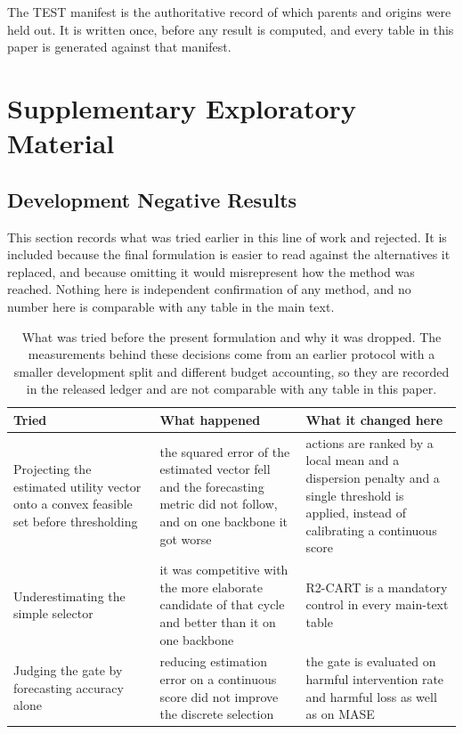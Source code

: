 \documentclass{article}
\begin{document}
The TEST manifest is the authoritative record of which parents and origins were held out. It
is written once, before any result is computed, and every table in this paper is generated
against that manifest.

\section*{Supplementary Exploratory Material}
\label{app:supplementary}
\subsection{Development Negative Results}
\label{app:development}
This section records what was tried earlier in this line of work and rejected. It is included
because the final formulation is easier to read against the alternatives it replaced, and
because omitting it would misrepresent how the method was reached. Nothing here is independent
confirmation of any method, and no number here is comparable with any table in the main text.

\begin{table}[htbp]
  \caption{What was tried before the present formulation and why it was dropped. The
  measurements behind these decisions come from an earlier protocol with a smaller development
  split and different budget accounting, so they are recorded in the released ledger and are
  not comparable with any table in this paper.}
  \label{tab:app-development}
  \centering
  \small
  \setlength{\tabcolsep}{4pt}
\begin{tabular}{@{}p{} p{} p{}@{}}
    \toprule
    Tried & What happened & What it changed here \\
    \midrule
    Projecting the estimated utility vector onto a convex feasible set before thresholding & the squared error of the estimated vector fell and the forecasting metric did not follow, and on one backbone it got worse & actions are ranked by a local mean and a dispersion penalty and a single threshold is applied, instead of calibrating a continuous score \\
    Underestimating the simple selector & it was competitive with the more elaborate candidate of that cycle and better than it on one backbone & R2-CART is a mandatory control in every main-text table \\
    Judging the gate by forecasting accuracy alone & reducing estimation error on a continuous score did not improve the discrete selection & the gate is evaluated on harmful intervention rate and harmful loss as well as on MASE \\
    \bottomrule
  \end{tabular}
\end{table}
\end{document}
